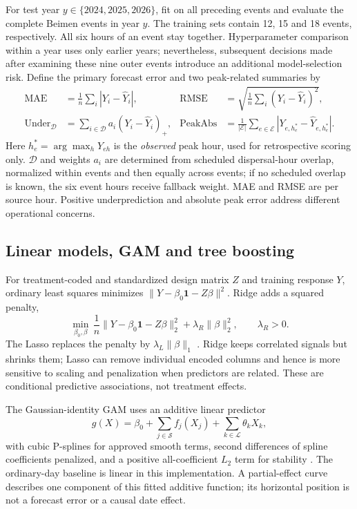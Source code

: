 For test year $y\in\{2024,2025,2026\}$, fit on all preceding events and evaluate the complete Beimen events in year $y$. The training sets contain 12, 15 and 18 events, respectively. All six hours of an event stay together. Hyperparameter comparison within a year uses only earlier years; nevertheless, subsequent decisions made after examining these nine outer events introduce an additional model-selection risk. Define the primary forecast error and two peak-related summaries by
\begin{align}
\operatorname{MAE}&=\frac1n\sum_i|Y_i-\widehat Y_i|,&
\operatorname{RMSE}&=\sqrt{\frac1n\sum_i(Y_i-\widehat Y_i)^2},\label{eq:metrics}\\
\operatorname{Under}_{\mathcal D}
&=\sum_{i\in\mathcal D}a_i(Y_i-\widehat Y_i)_+,&
\operatorname{PeakAbs}
&=\frac1{|\mathcal E|}\sum_{e\in\mathcal E}
  |Y_{e,h_e^*}-\widehat Y_{e,h_e^*}|.\label{eq:peakmetrics}
\end{align}
Here $h_e^*=\arg\max_hY_{eh}$ is the \emph{observed} peak hour, used for retrospective scoring only. $\mathcal D$ and weights $a_i$ are determined from scheduled dispersal-hour overlap, normalized within events and then equally across events; if no scheduled overlap is known, the six event hours receive fallback weight. MAE and RMSE are per source hour. Positive underprediction and absolute peak error address different operational concerns.

\subsection{Linear models, GAM and tree boosting}
For treatment-coded and standardized design matrix $Z$ and training response $Y$, ordinary least squares minimizes $\|Y-\beta_0\mathbf1-Z\beta\|^2$. Ridge adds a squared penalty,
\begin{equation}
\min_{\beta_0,\beta}\,
\frac1n\|Y-\beta_0\mathbf1-Z\beta\|_2^2+
\lambda_R\|\beta\|_2^2,\qquad \lambda_R>0.
\label{eq:ridge}
\end{equation}
The Lasso replaces the penalty by $\lambda_L\|\beta\|_1$ \cite{lasso}. Ridge keeps correlated signals but shrinks them; Lasso can remove individual encoded columns and hence is more sensitive to scaling and penalization when predictors are related. These are conditional predictive associations, not treatment effects.

The Gaussian-identity GAM uses an additive linear predictor
\begin{equation}
g(X)=\beta_0+\sum_{j\in\mathcal S}f_j(X_j)+
\sum_{k\in\mathcal L}\theta_kX_k ,
\label{eq:gam}
\end{equation}
with cubic P-splines for approved smooth terms, second differences of spline coefficients penalized, and a positive all-coefficient $L_2$ term for stability \cite{gam,pspline}. The ordinary-day baseline is linear in this implementation. A partial-effect curve describes one component of this fitted additive function; its horizontal position is not a forecast error or a causal date effect.

